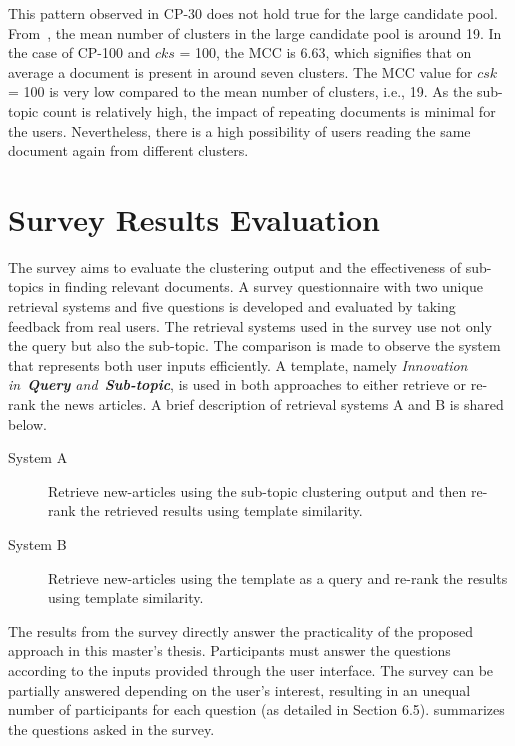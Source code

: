 This pattern observed in CP-30 does not hold true for the large candidate pool. From~, the mean number of clusters in the large candidate pool is around 19. In the case of CP-100 and $cks$ = 100, the \ac{MCC} is 6.63, which signifies that on average a document is present in around seven clusters. The \ac{MCC} value for $csk$ = 100 is very low compared to the mean number of clusters, i.e., 19. As the sub-topic count is relatively high, the impact of repeating documents is minimal for the users. Nevertheless, there is a high possibility of users reading the same document again from different clusters.



\section{Survey Results Evaluation}

The survey aims to evaluate the clustering output and the effectiveness of sub-topics in finding relevant documents. A survey questionnaire with two unique retrieval systems and five questions is developed and evaluated by taking feedback from real users. The retrieval systems used in the survey use not only the query but also the sub-topic. The comparison is made to observe the system that represents both user inputs efficiently. A template, namely \emph{Innovation in~\textbf{Query} and~\textbf{Sub-topic}}, is used in both approaches to either retrieve or re-rank the news articles. A brief description of retrieval systems A and B is shared below.

\begin{description}
	\item[System A] Retrieve new-articles using the sub-topic clustering output and then re-rank the retrieved results using template similarity.
	
	\item[System B] Retrieve new-articles using the template as a query and re-rank the results using template similarity.
\end{description}

The results from the survey directly answer the practicality of the proposed approach in this master's thesis. Participants must answer the questions according to the inputs provided through the user interface. The survey can be partially answered depending on the user's interest, resulting in an unequal number of participants for each question (as detailed in Section 6.5).  summarizes the questions asked in the survey.


